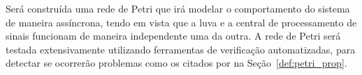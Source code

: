 
Será construída uma rede de Petri que irá modelar o comportamento do sistema de maneira assíncrona, tendo em vista que a luva e a central de processamento de sinais funcionam de maneira independente uma da outra. A rede de Petri será testada extensivamente utilizando ferramentas de verificação automatizadas, para detectar se ocorrerão problemas como os citados por  na Seção~\ref{def:petri_prop}.


